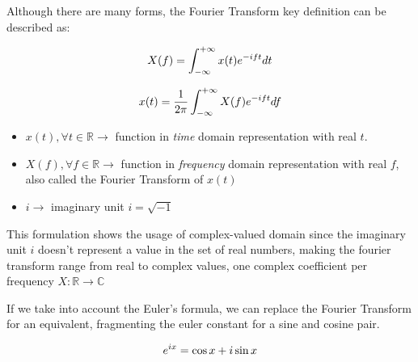 \documentclass[
  oneside,
  11pt, a4paper,
  footinclude=true,
  headinclude=true,
  cleardoublepage=empty
]{scrbook}
\newcommand{\eqname}[1]{\tag*{#1}}%
\begin{document}
Although there are many forms, the Fourier Transform key definition can be described as:

\begin{equation} \label{eq1}
    X(f) = \int_{-\infty}^{+\infty} x(t)e^{-i f t} dt \\ %
\end{equation}

\begin{equation} \label{eq2}
        x(t) = \frac{1}{2\pi} \int_{-\infty}^{+\infty} X(f)e^{-i f t} df \\ %
\end{equation}

\begin{itemize}
    \item \( x(t), \forall t \in \mathbb{R} \rightarrow \) function in \textit{time} domain representation with real \( t \).
    \item \( X(f), \forall f \in \mathbb{R} \rightarrow \) function in \textit{frequency} domain representation with real \( f \), also called the Fourier Transform of \( x(t) \)
    \item \( i \rightarrow \) imaginary unit \( i = \sqrt{-1} \)
\end{itemize}

This formulation shows the usage of complex-valued domain since the imaginary unit \( i \) doesn't represent a value in the set of real numbers, making the fourier transform range from real to complex values, one complex coefficient per frequency \( X : \mathbb{R} \rightarrow \mathbb{C} \) 

If we take into account the Euler's formula, we can replace the Fourier Transform for an equivalent, fragmenting the euler constant for a sine and cosine pair.

\begin{equation} \label{eq:euler}
    e^{ix} = \cos x + i \sin x \\ %
\end{equation}
\end{document}
